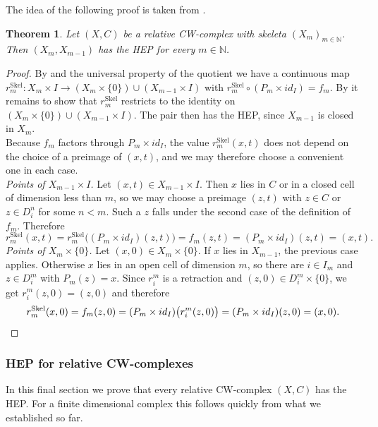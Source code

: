 \documentclass[11pt, a4paper, english]{article}
\theoremstyle{plain}
\newtheorem{theorem}{Theorem}
\theoremstyle{definition}
\theoremstyle{remark}
\numberwithin{equation}{section}
\numberwithin{theorem}{section}
\begin{document}
The idea of the following proof is taken from {\cite[page 40]{WAL}}.
\begin{theorem} \label{thm:HEPskeleton} 
    Let $(X,C)$ be a relative CW-complex with skeleta $(X_m)_{m \in \mathbb{N}}$. Then $(X_m,X_{m-1})$ has the HEP for every $m \in \mathbb{N}$.
\end{theorem}

\begin{proof}
By  and the universal property of the quotient we have a continuous map $r^{\mathrm{Skel}}_m \colon X_m \times I \to (X_m \times \{0\}) \cup (X_{m-1} \times I)$ with $r^{\mathrm{Skel}}_m \circ (P_m \times id_I) = f_m$. By  it remains to show that $r^{\mathrm{Skel}}_m$ restricts to the identity on $(X_m \times \{0\}) \cup (X_{m-1} \times I)$. The pair then has the HEP, since $X_{m-1}$ is closed in $X_m$.\\
Because $f_m$ factors through $P_m \times id_I$, the value $r^{\mathrm{Skel}}_m(x,t)$ does not depend on the choice of a preimage of $(x,t)$, and we may therefore choose a convenient one in each case. \\
\emph{Points of $X_{m-1} \times I$.} Let $(x,t) \in X_{m-1} \times I$. Then $x$ lies in $C$ or in a closed cell of dimension less than $m$, so we may choose a preimage $(z,t)$ with $z \in C$ or $z \in D_i^n$ for some $n < m$. Such a $z$ falls under the second case of the definition of $f_m$. Therefore
    \[
        r^{\mathrm{Skel}}_m(x,t)
        = r^{\mathrm{Skel}}_m\big((P_m \times id_I)(z,t)\big)
        = f_m(z,t) = (P_m \times id_I)(z,t) = (x,t) .
    \] 
\emph{Points of $X_m \times \{0\}$.} Let $(x,0) \in X_m \times \{0\}$. If $x$ lies in $X_{m-1}$, the previous case applies. Otherwise $x$ lies in an open cell of dimension $m$, so there are $i \in I_m$ and $z \in D_i^m$ with $P_m(z) = x$. Since $r_i^m$ is a retraction and $(z,0) \in D_i^m \times \{0\}$, we get $r_i^m(z,0) = (z,0)$ and therefore
    \[
        r^{\mathrm{Skel}}_m(x,0)
        = f_m(z,0)
        = (P_m \times id_I)\big(r_i^m(z,0)\big)
        = (P_m \times id_I)(z,0) = (x,0) . \qedhere
    \]
\end{proof}

\subsubsection{HEP for relative CW-complexes} \label{subsubsec:HEP_CW}
In this final section we prove that every relative CW-complex $(X,C)$ has the HEP. For a finite dimensional complex this follows quickly from what we established so far.
\end{document}
